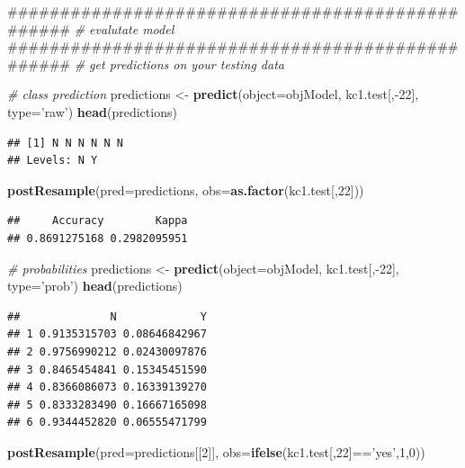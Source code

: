 \documentclass[]{book}
\newenvironment{Shaded}{\begin{snugshade}}{\end{snugshade}}
\newcommand{\KeywordTok}[1]{\textcolor[rgb]{0.13,0.29,0.53}{\textbf{{#1}}}}
\newcommand{\DataTypeTok}[1]{\textcolor[rgb]{0.13,0.29,0.53}{{#1}}}
\newcommand{\DecValTok}[1]{\textcolor[rgb]{0.00,0.00,0.81}{{#1}}}
\newcommand{\StringTok}[1]{\textcolor[rgb]{0.31,0.60,0.02}{{#1}}}
\newcommand{\CommentTok}[1]{\textcolor[rgb]{0.56,0.35,0.01}{\textit{{#1}}}}
\newcommand{\NormalTok}[1]{{#1}}
\begin{document}
\begin{Shaded}
\begin{Highlighting}[]
\NormalTok{#################################################}
\CommentTok{# evalutate model}
\NormalTok{#################################################}
\CommentTok{# get predictions on your testing data}

\CommentTok{# class prediction}
\NormalTok{predictions <-}\StringTok{ }\KeywordTok{predict}\NormalTok{(}\DataTypeTok{object=}\NormalTok{objModel, kc1.test[,-}\DecValTok{22}\NormalTok{], }\DataTypeTok{type=}\StringTok{'raw'}\NormalTok{)}
\KeywordTok{head}\NormalTok{(predictions)}
\end{Highlighting}
\end{Shaded}

\begin{verbatim}
## [1] N N N N N N
## Levels: N Y
\end{verbatim}

\begin{Shaded}
\begin{Highlighting}[]
\KeywordTok{postResample}\NormalTok{(}\DataTypeTok{pred=}\NormalTok{predictions, }\DataTypeTok{obs=}\KeywordTok{as.factor}\NormalTok{(kc1.test[,}\DecValTok{22}\NormalTok{]))}
\end{Highlighting}
\end{Shaded}

\begin{verbatim}
##     Accuracy        Kappa 
## 0.8691275168 0.2982095951
\end{verbatim}

\begin{Shaded}
\begin{Highlighting}[]
\CommentTok{# probabilities }
\NormalTok{predictions <-}\StringTok{ }\KeywordTok{predict}\NormalTok{(}\DataTypeTok{object=}\NormalTok{objModel, kc1.test[,-}\DecValTok{22}\NormalTok{], }\DataTypeTok{type=}\StringTok{'prob'}\NormalTok{)}
\KeywordTok{head}\NormalTok{(predictions)}
\end{Highlighting}
\end{Shaded}

\begin{verbatim}
##              N             Y
## 1 0.9135315703 0.08646842967
## 2 0.9756990212 0.02430097876
## 3 0.8465454841 0.15345451590
## 4 0.8366086073 0.16339139270
## 5 0.8333283490 0.16667165098
## 6 0.9344452820 0.06555471799
\end{verbatim}

\begin{Shaded}
\begin{Highlighting}[]
\KeywordTok{postResample}\NormalTok{(}\DataTypeTok{pred=}\NormalTok{predictions[[}\DecValTok{2}\NormalTok{]], }\DataTypeTok{obs=}\KeywordTok{ifelse}\NormalTok{(kc1.test[,}\DecValTok{22}\NormalTok{]==}\StringTok{'yes'}\NormalTok{,}\DecValTok{1}\NormalTok{,}\DecValTok{0}\NormalTok{))}
\end{Highlighting}
\end{Shaded}
\end{document}
